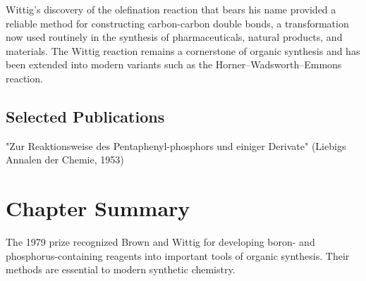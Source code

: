 Wittig's discovery of the olefination reaction that bears his name provided a reliable method for constructing carbon-carbon double bonds, a transformation now used routinely in the synthesis of pharmaceuticals, natural products, and materials. The Wittig reaction remains a cornerstone of organic synthesis and has been extended into modern variants such as the Horner–Wadsworth–Emmons reaction.

\subsection*{Selected Publications}

"Zur Reaktionsweise des Pentaphenyl-phosphors und einiger Derivate" (Liebigs Annalen der Chemie, 1953)

\clearpage

\section*{Chapter Summary}

The 1979 prize recognized Brown and Wittig for developing boron- and phosphorus-containing reagents into important tools of organic synthesis. Their methods are essential to modern synthetic chemistry.


